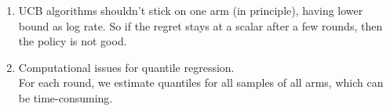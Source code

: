 \documentclass{article}
\begin{document}
\begin{enumerate}
\begin{enumerate}
    \item UCB algorithms shouldn't stick on one arm (in principle), having lower bound as log rate. So if the regret stays at a scalar after a few rounds, then the policy is not good.
    
    \item Computational issues for quantile regression. \\
    For each round, we estimate quantiles for all samples of all arms, which can be time-consuming. 
    
    \end{enumerate}


\end{enumerate}

\printbibliography
\end{document}
